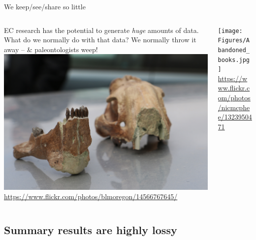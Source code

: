 \documentclass{beamer}
\newcommand{\linespace}{\vskip 0.25cm}
\begin{document}
\begin{frame}{We keep/see/share so little}
	
	\begin{columns}
		\begin{column}{0.6 \linewidth}
			EC research has the potential to generate \emph{huge} amounts of data.
			\linespace
			What do we normally do with that data?
			\linespace
			We normally throw it away -- \& paleontologists weep!
			\linespace
			\includegraphics[width = 0.8 \linewidth]{Figures/FossilsMedium.jpg} \\
			\tiny{\url{https://www.flickr.com/photos/blmoregon/14566767645/}}
		\end{column}
		\begin{column}{0.4 \linewidth}
			\texttt{[image: Figures/Abandoned\_books.jpg]} \\
			\tiny{\url{https://www.flickr.com/photos/nicmcphee/1323950471}}
		\end{column}
	\end{columns}
\end{frame}

\subsection{Summary results are highly lossy}
\end{document}
